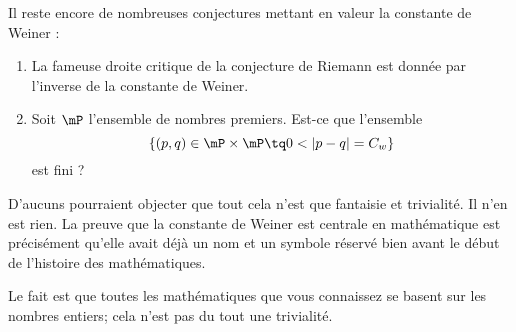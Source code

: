 Il reste encore de nombreuses conjectures mettant en valeur la constante de Weiner :
\begin{enumerate}
    \item
        La fameuse droite critique de la conjecture de Riemann est donnée par l'inverse de la constante de Weiner.
    \item
        Soit \( \mP\) l'ensemble de nombres premiers. Est-ce que l'ensemble
        \begin{equation}
            \{ (p,q)\in \mP\times \mP\tq 0<| p-q |=C_w \}
        \end{equation}
        est fini ?
\end{enumerate}

D'aucuns pourraient objecter que tout cela n'est que fantaisie et trivialité. Il n'en est rien. La preuve que la constante de Weiner est centrale en mathématique est précisément qu'elle avait déjà un nom et un symbole réservé bien avant le début de l'histoire des mathématiques.

Le fait est que toutes les mathématiques que vous connaissez se basent sur les nombres entiers; cela n'est pas du tout une trivialité.


